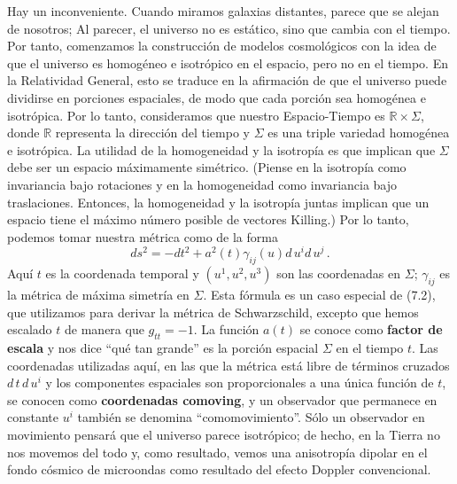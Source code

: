 \documentclass[11pt,b5paper,openany,twoside]{book}
\newcommand{\R}{\mathbb{R}}
\begin{document}
Hay un inconveniente.
Cuando miramos galaxias distantes, parece que se alejan de nosotros; Al parecer, el universo no es estático, sino que cambia con el tiempo.
Por tanto, comenzamos la construcción de modelos cosmológicos con la idea de que el universo es homogéneo e isotrópico en el espacio, pero no en el tiempo.
En la Relatividad General, esto se traduce en la afirmación de que el universo puede dividirse en porciones espaciales, de modo que cada porción sea homogénea e isotrópica.
Por lo tanto, consideramos que nuestro Espacio-Tiempo es $\R\times\Sigma$, donde $\R$ representa la dirección del tiempo y $\Sigma$ es una triple variedad homogénea e isotrópica.
La utilidad de la homogeneidad y la isotropía es que implican que $\Sigma$ debe ser un espacio máximamente simétrico.
(Piense en la isotropía como invariancia bajo rotaciones y en la homogeneidad como invariancia bajo traslaciones.
Entonces, la homogeneidad y la isotropía juntas implican que un espacio tiene el máximo número posible de vectores Killing.)
Por lo tanto, podemos tomar nuestra métrica como de la forma
\begin{equation}
ds^2 = -dt^2 + a^2(t)\gamma_{ij}(u) d\,u^i d\,u^j\,.\label{8.1}
\end{equation}
Aquí $t$ es la coordenada temporal y $(u^1, u^2, u^3)$ son las coordenadas en $\Sigma$; $\gamma_{ij}$ es la métrica de máxima simetría en $\Sigma$.
Esta fórmula es un caso especial de (7.2), que utilizamos para derivar la métrica de Schwarzschild, excepto que hemos escalado $t$ de manera que $g_{tt}=-1$.
La función $a(t)$ se conoce como {\bf factor de escala} y nos dice ``qué tan grande'' es la porción espacial $\Sigma$ en el tiempo $t$.
Las coordenadas utilizadas aquí, en las que la métrica está libre de términos cruzados $ d\,t\, d\,u^i$ y los componentes espaciales son proporcionales a una única función de $t$, se conocen como {\bf coordenadas comoving}, y un observador que permanece en constante $u^i$ también se denomina ``comomovimiento''.
Sólo un observador en movimiento pensará que el universo parece isotrópico; de hecho, en la Tierra no nos movemos del todo y, como resultado, vemos una anisotropía dipolar en el fondo cósmico de microondas como resultado del efecto Doppler convencional.
\end{document}
